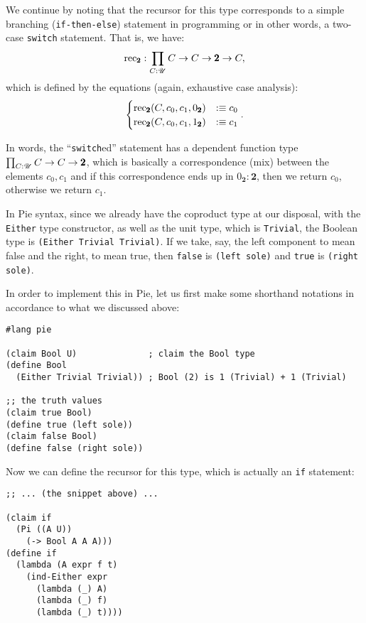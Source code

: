 We continue by noting that the recursor for this type corresponds to a
simple branching (\texttt{if-then-else}) statement in programming or in
other words, a two-case \texttt{switch} statement. That is, we have:
\[
  \mathrm{rec}_{\pmb{2}} : \prod_{C : \mathscr{U}} C \to C \to \pmb{2} \to C,
\]
which is defined by the equations (again, exhaustive case analysis):
\[
  \begin{cases}
    \mathrm{rec}_{\pmb{2}}(C, c_0, c_1, 0_{\pmb{2}}) &:\equiv c_0 \\
    \mathrm{rec}_{\pmb{2}}(C, c_0, c_1, 1_{\pmb{2}}) &:\equiv c_1
  \end{cases}.
\]

In words, the ``\texttt{switch}ed'' statement has a dependent function
type $ \prod_{C : \mathscr{U}} C \to C \to \pmb{2} $, which is basically
a correspondence (mix) between the elements $ c_0, c_1 $ and if this
correspondence ends up in $ 0_{\pmb{2}} : \pmb{2} $, then we return $ c_0 $,
otherwise we return $ c_1 $.

\vspace{0.3cm}

In Pie syntax, since we already have the coproduct type at our disposal,
with the \texttt{Either} type constructor, as well as the unit type,
which is \texttt{Trivial}, the Boolean type is \texttt{(Either Trivial Trivial)}.
If we take, say, the left component to mean false and the right, to mean true, then
\texttt{false} is \texttt{(left sole)} and \texttt{true} is \texttt{(right sole)}.

In order to implement this in Pie, let us first make some shorthand
notations in accordance to what we discussed above:
{
  \small
\begin{verbatim}
#lang pie

(claim Bool U)              ; claim the Bool type
(define Bool 
  (Either Trivial Trivial)) ; Bool (2) is 1 (Trivial) + 1 (Trivial)

;; the truth values
(claim true Bool)
(define true (left sole))
(claim false Bool)
(define false (right sole))
\end{verbatim}
}

Now we can define the recursor for this type, which is actually an \texttt{if}
statement:
{
  \small
\begin{verbatim}
;; ... (the snippet above) ...

(claim if
  (Pi ((A U))
    (-> Bool A A A)))
(define if
  (lambda (A expr f t)
    (ind-Either expr
      (lambda (_) A)
      (lambda (_) f)
      (lambda (_) t))))
\end{verbatim}
}

